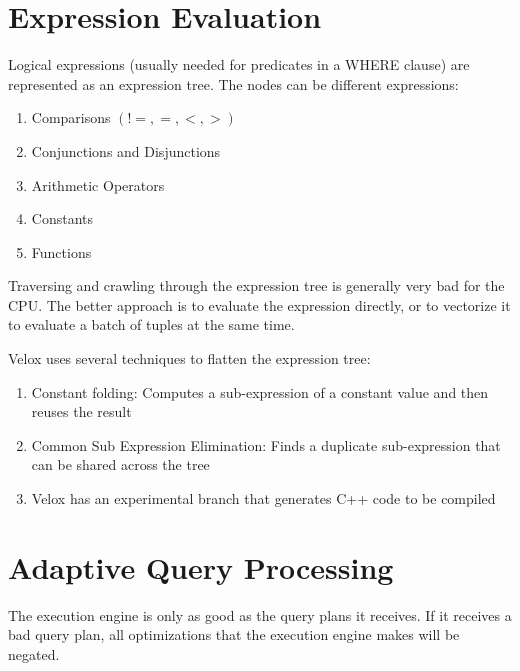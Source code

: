 \documentclass[11pt]{article}
\begin{document}


\section{Expression Evaluation}

Logical expressions (usually needed for predicates in a WHERE clause) are
represented as an expression tree. The nodes can be different expressions:
\begin{enumerate}
    \item Comparisons $(!=, =, <, >)$
    \item Conjunctions and Disjunctions
    \item Arithmetic Operators
    \item Constants
    \item Functions
\end{enumerate}

Traversing and crawling through the expression tree is generally very bad for
the CPU. The better approach is to evaluate the expression directly,
or to vectorize it to evaluate a batch of tuples at the same time.

Velox uses several techniques to flatten the expression tree:
\begin{enumerate}
    \item Constant folding: Computes a sub-expression of a constant value and
then reuses the result
    \item Common Sub Expression Elimination: Finds a duplicate sub-expression
that can be shared across the tree
    \item Velox has an experimental branch that generates C++ code
to be compiled
\end{enumerate}




\section{Adaptive Query Processing}

The execution engine is only as good as the query plans it receives.
If it receives a bad query plan, all optimizations that the execution
engine makes will be negated.
\end{document}
